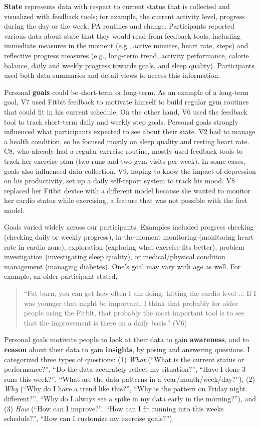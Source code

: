 \documentclass[12pt,oneside]{book}
\begin{document}
\textbf{State} represents data with respect to current status that is collected and visualized with feedback tools; for example, the current activity level, progress during the day or the week, PA routines and change. Participants reported various data about state that they would read from feedback tools, including immediate measures in the moment (e.g., active minutes, heart rate, steps) and reflective progress measures (e.g., long-term trend, activity performance, calorie balance, daily and weekly progress towards goals, and sleep quality). Participants used both data summaries and detail views to access this information.

Personal \textbf{goals} could be short-term or long-term. As an example of a long-term goal, V7 used Fitbit feedback to motivate himself to build regular gym routines that could fit in his current schedule. On the other hand, V6 used the feedback tool to track short-term daily and weekly step goals. Personal goals strongly influenced what participants expected to see about their state. V2 had to manage a health condition, so he focused mostly on sleep quality and resting heart rate. C8, who already had a regular exercise routine, mostly used feedback tools to track her exercise plan (two runs and two gym visits per week). In some cases, goals also influenced data collection. V9, hoping to know the impact of depression on his productivity, set up a daily self-report system to track his mood. V8 replaced her Fitbit device with a different model because she wanted to monitor her cardio status while exercising, a feature that was not possible with the first model.

Goals varied widely across our participants. Examples included progress checking (checking daily or weekly progress), in-the-moment monitoring (monitoring heart rate in cardio zone), exploration (exploring what exercise fits better), problem investigation (investigating sleep quality), or medical/physical condition management (managing diabetes). One's goal may vary with age as well. For example, an older participant stated, 
\begin{quote} 
``Fat burn, you can get how often I am doing, hitting the cardio level ... If I was younger that might be important. I think that probably for older people using the Fitbit, that probably the most important tool is to see that the improvement is there on a daily basis.'' (V6)
\end{quote}

Personal goals motivate people to look at their data to gain \textbf{awareness}, and to \textbf{reason} about their data to gain \textbf{insights}, by posing and answering questions. I categorized three types of questions: (1) \textit{What} (``What is the current status or performance?'', ``Do the data accurately reflect my situation?'', ``Have I done 3 runs this week?'', ``What are the data patterns in a year/month/week/day?''), (2) \textit{Why} (``Why do I have a trend like this?'', ``Why is the pattern on Friday night different?'', ``Why do I always see a spike in my data early in the morning?''), and (3) \textit{How} (``How can I improve?'', ``How can I fit running into this weeks schedule?'', ``How can I customize my exercise goals?''). 
\end{document}
